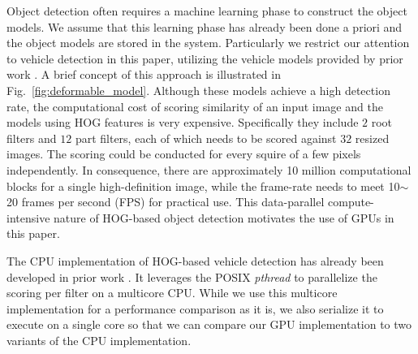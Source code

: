 Object detection often requires a machine learning phase to construct
the object models.
We assume that this learning phase has already been done a priori and
the object models are stored in the system.
Particularly we restrict our attention to vehicle detection in this
paper, utilizing the vehicle models provided by prior work
\cite{Niknejad12}.
A brief concept of this approach is illustrated in
Fig.~\ref{fig:deformable_model}.
Although these models achieve a high detection rate, the computational
cost of scoring similarity of an input image and the models using HOG
features is very expensive.
Specifically they include $2$ root filters and $12$ part filters, each
of which needs to be scored against $32$ resized images.
The scoring could be conducted for every squire of a few pixels
independently.
In consequence, there are approximately 10 million computational
blocks for a single high-definition image, while the frame-rate needs to
meet 10$\sim$20 frames per second (FPS) for practical use.
This data-parallel compute-intensive nature of HOG-based object
detection motivates the use of GPUs in this paper.

The CPU implementation of HOG-based vehicle detection has already been
developed in prior work \cite{Niknejad12}.
It leverages the POSIX \textit{pthread} to parallelize the scoring per
filter on a multicore CPU.
While we use this multicore implementation for a performance comparison
as it is, we also serialize it to execute on a single core so that we
can compare our GPU implementation to two variants of the CPU
implementation.
